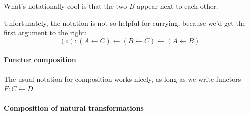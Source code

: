 \documentclass{article}
\newcommand{\from}{\leftarrow}
\begin{document}
What's notationally cool is that the two $B$ appear next to each other.

Unfortunately, the notation is not so helpful for currying, because we'd get the
first argument to the right:
\[(\circ) : (A \from C) \from (B \from C) \from (A \from B)\]


\paragraph{Functor composition}
The usual notation for composition works nicely, as long as we write functors $F
: C \from D$.

\paragraph{Composition of natural transformations}

%
\end{document}
